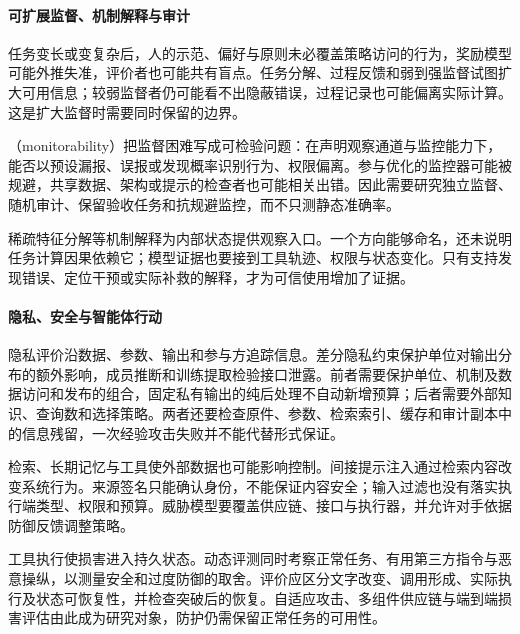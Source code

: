 \paragraph{可扩展监督、机制解释与审计}

任务变长或变复杂后，人的示范、偏好与原则未必覆盖策略访问的行为，奖励模型可能外推失准，评价者也可能共有盲点。任务分解、过程反馈和弱到强监督试图扩大可用信息；较弱监督者仍可能看不出隐蔽错误，过程记录也可能偏离实际计算。这是扩大监督时需要同时保留的边界。

（monitorability）把监督困难写成可检验问题：在声明观察通道与监控能力下，能否以预设漏报、误报或发现概率识别行为、权限偏离。参与优化的监控器可能被规避，共享数据、架构或提示的检查者也可能相关出错。因此需要研究独立监督、随机审计、保留验收任务和抗规避监控，而不只测静态准确率。

稀疏特征分解等机制解释为内部状态提供观察入口。一个方向能够命名，还未说明任务计算因果依赖它；模型证据也要接到工具轨迹、权限与状态变化。只有支持发现错误、定位干预或实际补救的解释，才为可信使用增加了证据。

\paragraph{隐私、安全与智能体行动}

隐私评价沿数据、参数、输出和参与方追踪信息。差分隐私约束保护单位对输出分布的额外影响，成员推断和训练提取检验接口泄露。前者需要保护单位、机制及数据访问和发布的组合，固定私有输出的纯后处理不自动新增预算；后者需要外部知识、查询数和选择策略。两者还要检查原件、参数、检索索引、缓存和审计副本中的信息残留，一次经验攻击失败并不能代替形式保证。

检索、长期记忆与工具使外部数据也可能影响控制。间接提示注入通过检索内容改变系统行为。来源签名只能确认身份，不能保证内容安全；输入过滤也没有落实执行端类型、权限和预算。威胁模型要覆盖供应链、接口与执行器，并允许对手依据防御反馈调整策略。

工具执行使损害进入持久状态。动态评测同时考察正常任务、有用第三方指令与恶意操纵，以测量安全和过度防御的取舍。评价应区分文字改变、调用形成、实际执行及状态可恢复性，并检查突破后的恢复。自适应攻击、多组件供应链与端到端损害评估由此成为研究对象，防护仍需保留正常任务的可用性。

